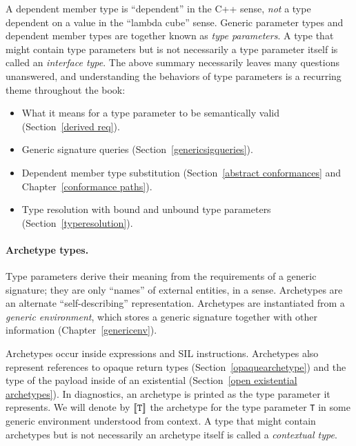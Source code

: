 \documentclass[../generics]{subfiles}
\begin{document}
A dependent member type is ``dependent'' in the C++ sense, \emph{not} a type  dependent on a value in the ``lambda cube'' sense. Generic parameter types and dependent member types are together known as \emph{type parameters}. A type that might contain type parameters but is not necessarily a type parameter itself is called an \emph{interface type}. The above summary necessarily leaves many questions unanswered, and understanding the behaviors of type parameters is a recurring theme throughout the book:
\begin{itemize}
\item What it means for a type parameter to be semantically valid (Section~\ref{derived req}).
\item Generic signature queries (Section~\ref{genericsigqueries}).
\item Dependent member type substitution (Section~\ref{abstract conformances} and Chapter~\ref{conformance paths}).
\item Type resolution with bound and unbound type parameters (Section~\ref{typeresolution}).
\end{itemize}

\paragraph{Archetype types.}
Type parameters derive their meaning from the requirements of a generic signature; they are only ``names'' of external entities, in a sense. Archetypes are an alternate ``self-describing'' representation. Archetypes are instantiated from a \emph{generic environment}, which stores a generic signature together with other information (Chapter~\ref{genericenv}).

Archetypes occur inside expressions and SIL instructions. Archetypes also represent references to opaque return types (Section~\ref{opaquearchetype}) and the type of the payload inside of an existential (Section~\ref{open existential archetypes}). In diagnostics, an archetype is printed as the type parameter it represents. We will denote by $[\![\texttt{T}]\!]$ the archetype for the type parameter \texttt{T} in some generic environment understood from context. A type that might contain archetypes but is not necessarily an archetype itself is called a \emph{contextual type}.

\medskip
\end{document}
